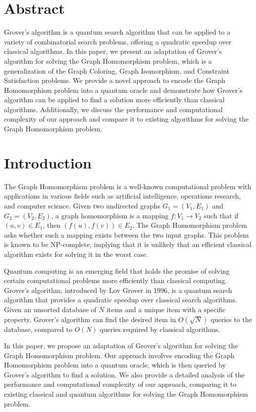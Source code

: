 \section*{Abstract}

Grover's algorithm is a quantum search algorithm that can be applied to a variety of combinatorial search problems, offering a quadratic speedup over classical algorithms. In this paper, we present an adaptation of Grover's algorithm for solving the Graph Homomorphism problem, which is a generalization of the Graph Coloring, Graph Isomorphism, and Constraint Satisfaction problems. We provide a novel approach to encode the Graph Homomorphism problem into a quantum oracle and demonstrate how Grover's algorithm can be applied to find a solution more efficiently than classical algorithms. Additionally, we discuss the performance and computational complexity of our approach and compare it to existing algorithms for solving the Graph Homomorphism problem.

\section{Introduction}

The Graph Homomorphism problem is a well-known computational problem with applications in various fields such as artificial intelligence, operations research, and computer science. Given two undirected graphs $G_1 = (V_1, E_1)$ and $G_2 = (V_2, E_2)$, a graph homomorphism is a mapping $f : V_1 \rightarrow V_2$ such that if $(u,v) \in E_1$, then $(f(u), f(v)) \in E_2$. The Graph Homomorphism problem asks whether such a mapping exists between the two input graphs. This problem is known to be NP-complete, implying that it is unlikely that an efficient classical algorithm exists for solving it in the worst case.

Quantum computing is an emerging field that holds the promise of solving certain computational problems more efficiently than classical computing. Grover's algorithm, introduced by Lov Grover in 1996, is a quantum search algorithm that provides a quadratic speedup over classical search algorithms. Given an unsorted database of $N$ items and a unique item with a specific property, Grover's algorithm can find the desired item in $O(\sqrt{N})$ queries to the database, compared to $O(N)$ queries required by classical algorithms.

In this paper, we propose an adaptation of Grover's algorithm for solving the Graph Homomorphism problem. Our approach involves encoding the Graph Homomorphism problem into a quantum oracle, which is then queried by Grover's algorithm to find a solution. We also provide a detailed analysis of the performance and computational complexity of our approach, comparing it to existing classical and quantum algorithms for solving the Graph Homomorphism problem.

